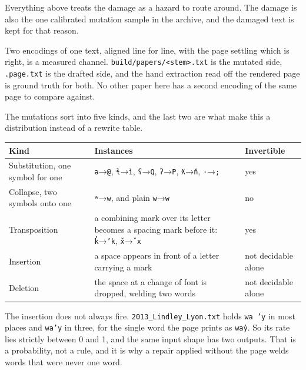 Everything above treats the damage as a hazard to route around. The damage is also the one calibrated mutation sample in the archive, and the damaged text is kept for that reason.

Two encodings of one text, aligned line for line, with the page settling which is right, is a measured channel. \texttt{build/\allowbreak{}papers/\allowbreak{}<stem>.\allowbreak{}txt} is the mutated side, \texttt{.\allowbreak{}page.\allowbreak{}txt} is the drafted side, and the hand extraction read off the rendered page is ground truth for both. No other paper here has a second encoding of the same page to compare against.

The mutations sort into five kinds, and the last two are what make this a distribution instead of a rewrite table.

\tiny
\setlength{\tabcolsep}{2pt}
\begin{longtable}{@{}>{\raggedright\arraybackslash}p{}>{\raggedright\arraybackslash}p{}>{\raggedright\arraybackslash}p{}@{}}
\toprule
Kind & Instances & Invertible \\
\midrule
Substitution, one symbol for one & \texttt{ə}→\texttt{@}, \texttt{ɬ}→\texttt{ì}, \texttt{ʕ}→\texttt{Q}, \texttt{ʔ}→\texttt{P}, \texttt{ƛ}→\texttt{ň}, \texttt{·}→\texttt{;} & yes \\
Collapse, two symbols onto one & \texttt{ʷ}→\texttt{w}, and plain \texttt{w}→\texttt{w} & no \\
Transposition & a combining mark over its letter becomes a spacing mark before it: \texttt{k̓}→\texttt{’k}, \texttt{x̌}→\texttt{ˇx} & yes \\
Insertion & a space appears in front of a letter carrying a mark & not decidable alone \\
Deletion & the space at a change of font is dropped, welding two words & not decidable alone \\
\bottomrule
\end{longtable}
\normalsize

The insertion does not always fire. \texttt{2013\_\allowbreak{}Lindley\_\allowbreak{}Lyon.\allowbreak{}txt} holds \texttt{wa ’y} in most places and \texttt{wa’y} in three, for the single word the page prints as \texttt{way̓}. So its rate lies strictly between 0 and 1, and the same input shape has two outputs. That is a probability, not a rule, and it is why a repair applied without the page welds words that were never one word.


